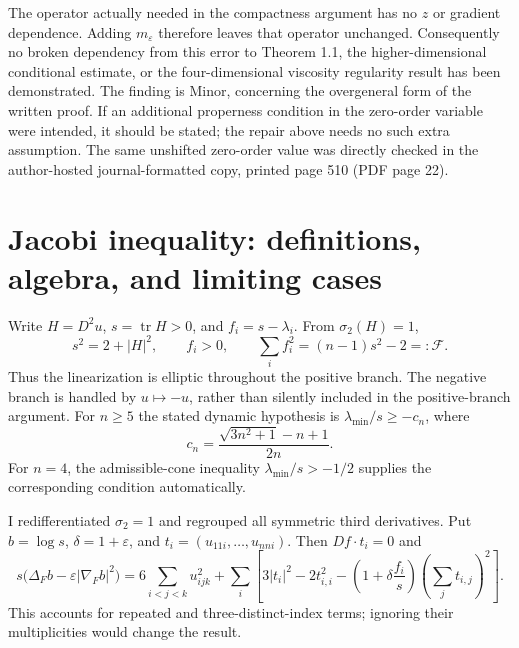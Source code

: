 \documentclass[10pt]{article}
\begin{document}
The operator actually needed in the compactness argument has no \(z\) or gradient dependence. Adding \(m_\varepsilon\) therefore leaves that operator unchanged. Consequently no broken dependency from this error to Theorem 1.1, the higher-dimensional conditional estimate, or the four-dimensional viscosity regularity result has been demonstrated. The finding is Minor, concerning the overgeneral form of the written proof. If an additional properness condition in the zero-order variable were intended, it should be stated; the repair above needs no such extra assumption. The same unshifted zero-order value was directly checked in the author-hosted journal-formatted copy, printed page 510 (PDF page 22).\par
\section*{Jacobi inequality: definitions, algebra, and limiting cases}
Write \(H=D^2u\), \(s=\operatorname{tr}H>0\), and \(f_i=s-\lambda_i\). From \(\sigma_2(H)=1\), \[s^2=2+|H|^2,\qquad f_i>0,\qquad
 \sum_i f_i^2=(n-1)s^2-2=:\mathcal F.\] Thus the linearization is elliptic throughout the positive branch. The negative branch is handled by \(u\mapsto-u\), rather than silently included in the positive-branch argument. For \(n\ge5\) the stated dynamic hypothesis is \(\lambda_{\min}/s\ge-c_n\), where \[c_n=\frac{\sqrt{3n^2+1}-n+1}{2n}.\] For \(n=4\), the admissible-cone inequality \(\lambda_{\min}/s>-1/2\) supplies the corresponding condition automatically.\par
I redifferentiated \(\sigma_2=1\) and regrouped all symmetric third derivatives. Put \(b=\log s\), \(\delta=1+\varepsilon\), and \(t_i=(u_{11i},\ldots,u_{nni})\). Then \(Df\cdot t_i=0\) and \[s\bigl(\Delta_F b-\varepsilon|\nabla_F b|^2\bigr)
 =6\sum_{i<j<k}u_{ijk}^2+\sum_i
 \left[3|t_i|^2-2t_{i,i}^2-
       \left(1+\delta\frac{f_i}{s}\right)
                \left(\sum_j t_{i,j}\right)^2\right].\] This accounts for repeated and three-distinct-index terms; ignoring their multiplicities would change the result.\par
\end{document}
